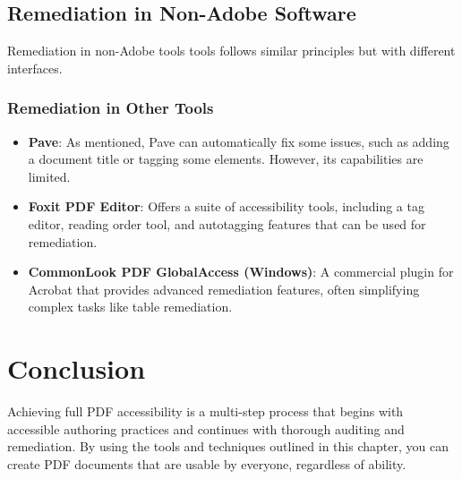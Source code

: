 \subsection{Remediation in Non-Adobe Software}
\label{subsec:remediation-non-adobe}
Remediation in non-Adobe tools tools follows similar principles but with different interfaces.

\subsubsection{Remediation in Other Tools}
\label{ssubsec:remediation-other-tools}
\begin{itemize}
	\item \textbf{Pave}: As mentioned, Pave can automatically fix some issues, such as adding a document title or tagging some elements. However, its capabilities are limited.
	\item \textbf{Foxit PDF Editor}: Offers a suite of accessibility tools, including a tag editor, reading order tool, and autotagging features that can be used for remediation.
	\item \textbf{CommonLook PDF GlobalAccess (Windows)\supercite{AllyantCommonLook}}: A commercial plugin for Acrobat that provides advanced remediation features, often simplifying complex tasks like table remediation.
\end{itemize}

\section{Conclusion}
\label{sec:pdf-report-conclusion}
Achieving full PDF accessibility is a multi-step process that begins with accessible authoring practices and continues with thorough auditing and remediation. By using the tools and techniques outlined in this chapter, you can create PDF documents that are usable by everyone, regardless of ability.
